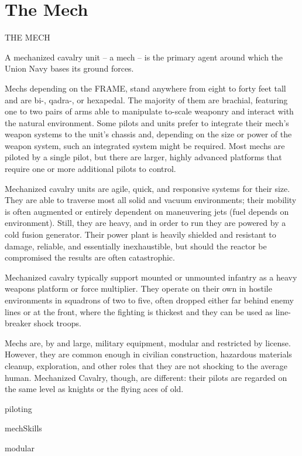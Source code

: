 \part{The Mech}

THE MECH

A mechanized cavalry unit -- a mech -- is the primary agent around which the Union Navy
bases its ground forces.

Mechs depending on the FRAME, stand anywhere from eight to forty feet tall and are bi-, qadra-,
or hexapedal. The majority of them are brachial, featuring one to two pairs of arms able to
manipulate to-scale weaponry and interact with the natural environment. Some pilots and units
prefer to integrate their mech’s weapon systems to the unit’s chassis and, depending on the size
or power of the weapon system, such an integrated system might be required. Most mechs are
piloted by a single pilot, but there are larger, highly advanced platforms that require one or more
additional pilots to control.


Mechanized cavalry units are agile, quick, and responsive systems for their size. They are able to
traverse most all solid and vacuum environments; their mobility is often augmented or entirely
dependent on maneuvering jets (fuel depends on environment). Still, they are heavy, and in order
to run they are powered by a cold fusion generator. Their power plant is heavily shielded and
resistant to damage, reliable, and essentially inexhaustible, but should the reactor be
compromised the results are often catastrophic.


Mechanized cavalry typically support mounted or unmounted infantry as a heavy weapons
platform or force multiplier. They operate on their own in hostile environments in squadrons of
two to five, often dropped either far behind enemy lines or at the front, where the fighting is
thickest and they can be used as line-breaker shock troops.


Mechs are, by and large, military equipment, modular and restricted by license. However, they
are common enough in civilian construction, hazardous materials cleanup, exploration, and other
roles that they are not shocking to the average human. Mechanized Cavalry, though, are
different: their pilots are regarded on the same level as knights or the flying aces of old.

{piloting}

{mechSkills}

{modular}




